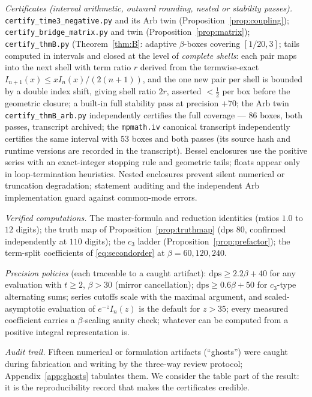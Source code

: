 \documentclass[11pt]{article}
\theoremstyle{remark}
\begin{document}
\begin{sloppypar}
\emph{Certificates (interval arithmetic, outward rounding, nested or
stability passes).} \texttt{certify\_time3\_negative.py} and its Arb twin
(Proposition~\ref{prop:coupling}); \texttt{certify\_bridge\_matrix.py}
and twin (Proposition~\ref{prop:matrix}); \texttt{certify\_thmB.py}
(Theorem~\ref{thm:B}: adaptive $\beta$-boxes covering $[1/20,3]$;
tails computed in intervals and closed at the level of
\emph{complete shells}: each pair maps into the next shell with term
ratio $r$ derived from the termwise-exact
$I_{n+1}(x)\le xI_n(x)/(2(n+1))$, and the one new pair per shell is
bounded by a double index shift, giving shell ratio $2r$, asserted
$<\tfrac12$ per box before the geometric closure; a built-in full stability pass at
precision $+70$; the Arb twin \texttt{certify\_thmB\_arb.py} independently
certifies the full coverage --- $86$ boxes, both passes, transcript
archived; the \texttt{mpmath.iv} canonical transcript independently
certifies the same interval with $53$ boxes and both passes (its source hash
and runtime versions are recorded in the transcript). Bessel enclosures use the positive
series with an exact-integer stopping rule and geometric tails; floats
appear only in loop-termination heuristics. Nested enclosures prevent
silent numerical or truncation degradation; statement auditing and the
independent Arb implementation guard against common-mode errors.
\end{sloppypar}

\emph{Verified computations.} The master-formula and reduction identities
(ratios $1.0$ to $12$ digits); the truth map of
Proposition~\ref{prop:truthmap} (dps $80$, confirmed independently at
$110$ digits); the $c_3$ ladder (Proposition~\ref{prop:prefactor}); the
term-split coefficients of \eqref{eq:secondorder} at
$\beta=60,120,240$.

\emph{Precision policies} (each traceable to a caught artifact):
$\mathrm{dps}\ge2.2\beta+40$ for any evaluation with $t\ge2$, $\beta>30$
(mirror cancellation); $\mathrm{dps}\ge0.6\beta+50$ for $c_3$-type
alternating sums; series cutoffs scale with the maximal argument, and
scaled-asymptotic evaluation of $e^{-z}I_n(z)$ is the default for
$z>35$; every measured coefficient carries a $\beta$-scaling sanity
check; whatever can be computed from a positive integral representation
is.

\emph{Audit trail.} Fifteen numerical or formulation artifacts
(``ghosts'') were caught during fabrication and writing by the three-way
review protocol; Appendix~\ref{app:ghosts} tabulates them. We consider
the table part of the result: it is the reproducibility record that
makes the certificates credible.
\end{document}
